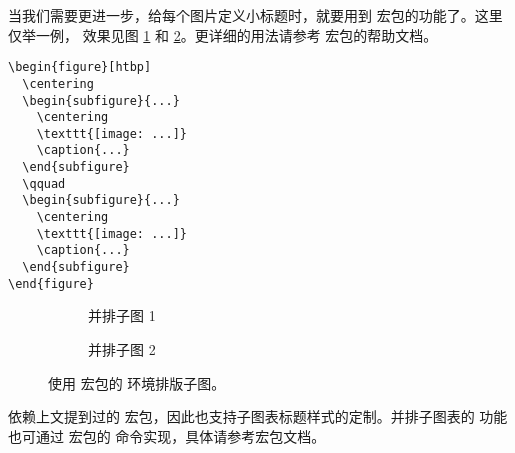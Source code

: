 当我们需要更进一步，给每个图片定义小标题时，就要用到  宏包的功能了。这里仅举一例，
效果见图 \ref{fig:subfigure-cap1} 和 \ref{fig:subfigure-cap2}。更详细的用法请参考 
宏包的帮助文档。
\begin{verbatim}
\begin{figure}[htbp]
  \centering
  \begin{subfigure}{...}
    \centering
    \texttt{[image: ...]}
    \caption{...}
  \end{subfigure}
  \qquad
  \begin{subfigure}{...}
    \centering
    \texttt{[image: ...]}
    \caption{...}
  \end{subfigure}
\end{figure}
\end{verbatim}

\begin{figure}[htp]
  \centering
  \begin{subfigure}{12em}
    \centering
    \caption{并排子图 1}
    \label{fig:subfigure-cap1}
  \end{subfigure}
  \qquad
  \begin{subfigure}{12em}
    \centering
    \caption{并排子图 2}
    \label{fig:subfigure-cap2}
  \end{subfigure}
  \caption{使用  宏包的  环境排版子图。}
  \label{fig:subcaption}
\end{figure}

 依赖上文提到过的  宏包，因此也支持子图表标题样式的定制。并排子图表的
功能也可通过  宏包的  命令实现，具体请参考宏包文档。

\endinput
